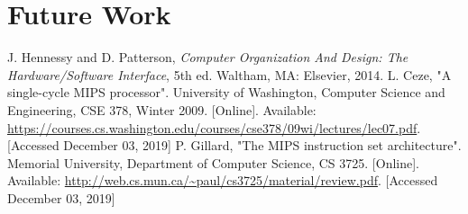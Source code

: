 \documentclass[conference]{IEEEtran}
\begin{document}
\section{Future Work}

\begin{thebibliography}{00}
 J. Hennessy and D. Patterson, \textit{Computer Organization And Design: The Hardware/Software Interface}, 5th ed. Waltham, MA: Elsevier, 2014.
 L. Ceze, "A single-cycle MIPS processor". University of Washington, Computer Science and Engineering, CSE 378, Winter 2009. [Online]. Available: \url{https://courses.cs.washington.edu/courses/cse378/09wi/lectures/lec07.pdf}. [Accessed December 03, 2019]
 P. Gillard, "The MIPS instruction set architecture". Memorial University, Department of Computer Science, CS 3725. [Online]. Available: \url{http://web.cs.mun.ca/~paul/cs3725/material/review.pdf}. [Accessed December 03, 2019]
\end{thebibliography}
\end{document}
